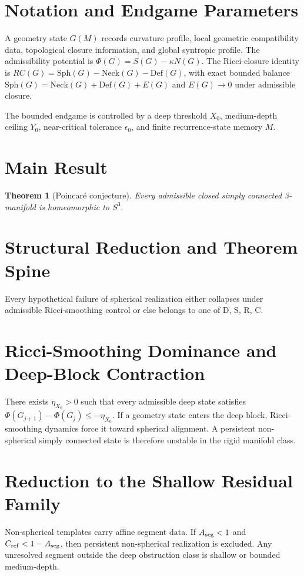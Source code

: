 \documentclass[11pt,a4paper]{article}
\newtheorem{theorem}{Theorem}
\begin{document}
\section{Notation and Endgame Parameters}
A geometry state \(G(M)\) records curvature profile, local geometric compatibility data, topological closure information, and global syntropic profile. The admissibility potential is \(\Phi(G) = S(G) - \kappa N(G)\). The Ricci-closure identity is \(RC(G) = \mathrm{Sph}(G) - \mathrm{Neck}(G) - \mathrm{Def}(G)\), with exact bounded balance \(\mathrm{Sph}(G) = \mathrm{Neck}(G) + \mathrm{Def}(G) + E(G)\) and \(E(G) \to 0\) under admissible closure.

The bounded endgame is controlled by a deep threshold \(X_0\), medium-depth ceiling \(Y_0\), near-critical tolerance \(\epsilon_0\), and finite recurrence-state memory \(M\).

\section{Main Result}
\begin{theorem}[Poincar\'e conjecture]
Every admissible closed simply connected 3-manifold is homeomorphic to \(S^3\).
\end{theorem}

\section{Structural Reduction and Theorem Spine}
Every hypothetical failure of spherical realization either collapses under admissible Ricci-smoothing control or else belongs to one of D, S, R, C.

\section{Ricci-Smoothing Dominance and Deep-Block Contraction}
There exists \(\eta_{X_0} > 0\) such that every admissible deep state satisfies \(\Phi(G_{j+1}) - \Phi(G_j) \le -\eta_{X_0}\). If a geometry state enters the deep block, Ricci-smoothing dynamics force it toward spherical alignment. A persistent non-spherical simply connected state is therefore unstable in the rigid manifold class.

\section{Reduction to the Shallow Residual Family}
Non-spherical templates carry affine segment data. If \(A_{\rm seg} < 1\) and \(C_{\rm ref} < 1 - A_{\rm seg}\), then persistent non-spherical realization is excluded. Any unresolved segment outside the deep obstruction class is shallow or bounded medium-depth.
\end{document}
